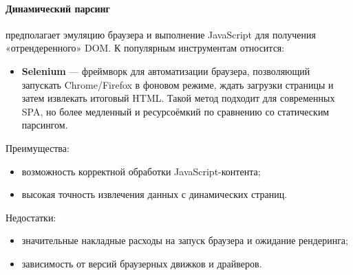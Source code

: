 \paragraph{Динамический парсинг} предполагает эмуляцию браузера и выполнение JavaScript для получения «отрендеренного» DOM. К популярным инструментам относится:
\begin{itemize}
    \item \textbf{Selenium}\cite{selenium-doc} — фреймворк для автоматизации браузера, позволяющий запускать Chrome/Firefox в фоновом режиме, ждать загрузки страницы и затем извлекать итоговый HTML. Такой метод подходит для современных SPA, но более медленный и ресурсоёмкий по сравнению со статическим парсингом.
\end{itemize}
Преимущества:
\begin{itemize}
    \item возможность корректной обработки JavaScript-контента;
    \item высокая точность извлечения данных с динамических страниц.
\end{itemize}
Недостатки:
\begin{itemize}
    \item значительные накладные расходы на запуск браузера и ожидание рендеринга;
    \item зависимость от версий браузерных движков и драйверов.
\end{itemize}

